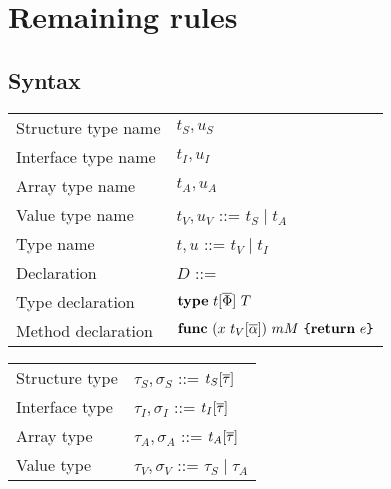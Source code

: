 \documentclass[12pt]{article}
\begin{document}


\section{Remaining rules}
\label{sec:remaining-rules}

\subsection{Syntax}

\begin{minipage}[t]{\textwidth}
    \begin{tabular}[t]{ll}
        Structure type name      & $t_S, u_S$                                           \\
        Interface type name      & $t_I, u_I$                                           \\
        Array type name          & $t_A, u_A$                                           \\
        Value type name          & $t_V, u_V$ ::= $t_S \mid t_A$                        \\
        Type name                & $t, u$ ::= $t_V \mid t_I$                            \\
        Declaration              & $D$ ::=                                              \\
        \quad Type declaration   & \quad $\texttt{\bf type}~t[\overline{\Phi}]~T$                         \\
        \quad Method declaration & \quad $\texttt{\bf func}~(x~t_V[\overline{\alpha}])~mM~\texttt{\{}\texttt{\bf return}~e\texttt{\}}$ \\
    \end{tabular}
\end{minipage}
\hspace{-0.5\textwidth}
\begin{minipage}[t]{0.4\textwidth}
    \begin{tabular}[t]{ll}
        Structure type & $\tau_S, \sigma_S$ ::= $t_S[\overline{\tau}]$     \\
        Interface type & $\tau_I, \sigma_I$ ::= $t_I[\overline{\tau}]$     \\
        Array type     & $\tau_A, \sigma_A$ ::= $t_A[\overline{\tau}]$     \\
        Value type     & $\tau_V, \sigma_V$ ::= $\tau_S \mid \tau_A$ \\
    \end{tabular}
\end{minipage}
\end{document}
